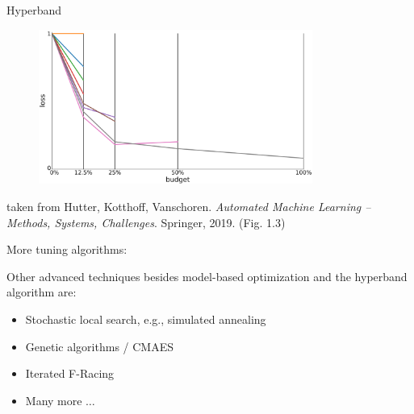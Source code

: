 \begin{vbframe}{Hyperband}
  \begin{center}
\begin{figure}
\includegraphics[width=0.8\textwidth]{figure_man/hyperband3.png}
\end{figure}
\end{center}
\tiny taken from Hutter, Kotthoff, Vanschoren. \textit{Automated Machine Learning -- Methods, Systems, Challenges}. Springer, 2019. (Fig. 1.3)
\end{vbframe}

\begin{frame}{More tuning algorithms:}

Other advanced techniques besides model-based optimization and the hyperband algorithm are: 
  
  \begin{itemize}
\item Stochastic local search, e.g., simulated annealing
\item Genetic algorithms / CMAES
\item Iterated F-Racing
\item Many more $\ldots$
  \end{itemize}


\end{frame}
\endlecture

